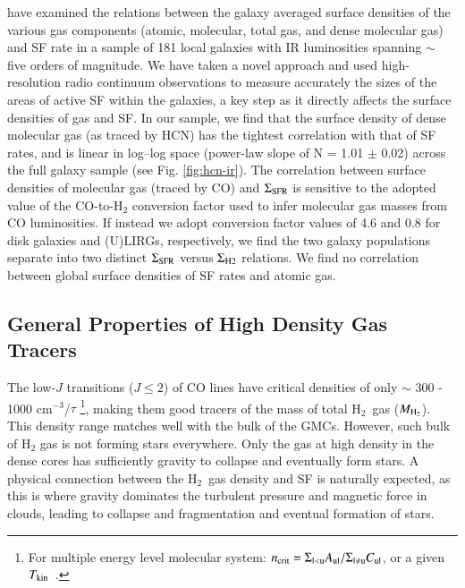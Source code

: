 \documentclass[legal,11pt]{article}
\def\cmt   {cm$^{-3}$\,}
\def\,{\thinspace}
\def\Htwo{H$_2$}
\def\MHtwo{$M_{\rm H_2}$}
\def\Tkin{$T_{\rm kin}$}
\def\Htwo       {H$_2$}
\begin{document}
\cite{lgg2015} have examined the relations between the galaxy averaged surface
densities of the various gas components (atomic, molecular, total gas, and
dense molecular gas) and SF rate in a sample of 181 local galaxies with IR
luminosities spanning $\sim$ five orders of magnitude. We have taken a novel
approach and used high-resolution radio continuum observations to measure
accurately the sizes of the areas of active SF within the galaxies, a key step
as it directly affects the surface densities of gas and SF. In our
sample, we find that the surface density of dense molecular gas (as traced by
HCN) has the tightest correlation with that of SF rates, and is linear in
log--log space (power-law slope of N = 1.01 $\pm$ 0.02) across the full galaxy
sample (see Fig. \ref{fig:hcn-ir}). The correlation between surface densities
of molecular gas (traced by CO) and $\Sigma_{\rm SFR}$ is sensitive to the
adopted value of the CO-to-H$_2$ conversion factor used to infer molecular gas
masses from CO luminosities. If instead we adopt conversion factor values  of
4.6 and 0.8 for disk galaxies and (U)LIRGs, respectively, we find the two
galaxy populations separate into two distinct $\Sigma_{\rm SFR}$  versus
$\Sigma_{\rm H2}$ relations. We find no correlation between global surface
densities of SF rates and atomic gas.

\subsection{General Properties of High Density Gas Tracers  }

The low-$J$ transitions ($J\le2$) of CO lines have critical densities of only
$\sim$ 300 - 1000 \cmt/$\tau$ \footnote{For multiple energy level molecular
system: $n_{\rm crit}={\Sigma_{\rm l<u} A_{\rm ul}}/{\Sigma_{\rm l\neq u}
C_{\rm ul}}$, or a given \Tkin\ \citep{Jansen1995, Osterbrock2006}.}, making them good
tracers of the mass of total \Htwo\ gas (\MHtwo). This density range matches
well with the bulk of the GMCs. However, such bulk of H$_2$ gas is not
forming stars everywhere.  Only the gas at high density in the dense cores has
sufficiently gravity to collapse and eventually form stars.  A physical
connection between the \Htwo\ gas density and SF is naturally expected, 
as this is where gravity dominates the turbulent pressure and magnetic force 
in clouds, leading to collapse and fragmentation and eventual formation of stars.



\end{document}
